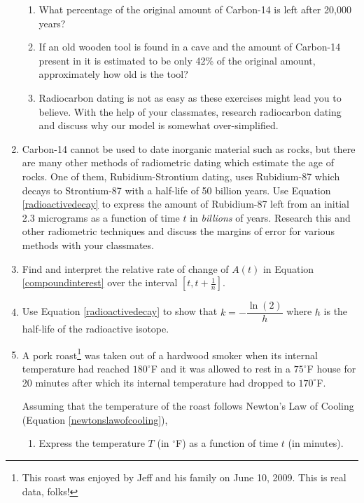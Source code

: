 \documentclass{ximera}
\begin{document}
\begin{enumerate}
\begin{enumerate}
\item What percentage of the original amount of Carbon-14 is left after 20,000 years?

\item If an old wooden tool is found in a cave and the amount of Carbon-14 present in it is estimated to be only 42\% of the original amount, approximately how old is the tool?

\item Radiocarbon dating is not as easy as these exercises might lead you to believe.  With the help of your classmates, research radiocarbon dating and discuss why our model is somewhat over-simplified.  

\end{enumerate}

\item Carbon-14 cannot be used to date inorganic material such as rocks, but there are many other methods of radiometric dating which estimate the age of rocks.  One of them, Rubidium-Strontium dating, uses Rubidium-87 which decays to Strontium-87 with a half-life of 50 billion years.  Use Equation \ref{radioactivedecay} to express the amount of Rubidium-87 left from an initial 2.3 micrograms as a function of time $t$ in \emph{billions} of years.  Research this and other radiometric techniques and discuss the margins of error for various methods with your classmates.

\item  Find and interpret the relative rate of change of  $A(t)$ in Equation \ref{compoundinterest} over the interval $\left[t, t+\frac{1}{n} \right]$.

\item Use Equation \ref{radioactivedecay} to show that $k = -\dfrac{\ln(2)}{h}$ where $h$ is the half-life of the radioactive isotope.

\item A pork roast\footnote{This roast was enjoyed by Jeff and his family on June 10, 2009.  This is real data, folks!} was taken out of a hardwood smoker when its internal temperature had reached $180^{\circ}$F and it was allowed to rest in a $75^{\circ}$F house for 20 minutes after which its internal temperature had dropped to $170^{\circ}$F. 

Assuming that the temperature of the roast follows Newton's Law of Cooling (Equation \ref{newtonslawofcooling}),

\begin{enumerate}

\item Express the temperature $T$ (in $^{\circ}$F) as a function of time $t$ (in minutes).


\end{enumerate}
\end{enumerate}
\end{document}
